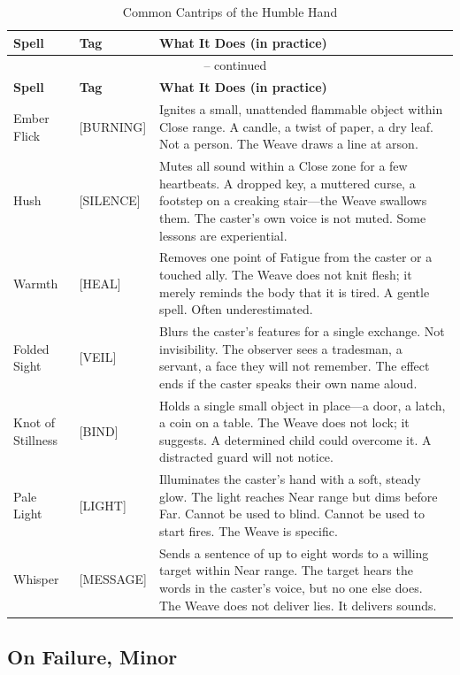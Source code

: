 \medskip
\noindent
\begin{longtable}{p{} p{} p{}}
\caption{Common Cantrips of the Humble Hand}\\
\midrule
\textbf{Spell} & \textbf{Tag} & \textbf{What It Does (in practice)}\\
\midrule
\endfirsthead
\multicolumn{3}{c}{\tablename\ \thetable{} -- continued}\\
\midrule
\textbf{Spell} & \textbf{Tag} & \textbf{What It Does (in practice)}\\
\midrule
\endhead
Ember Flick & [BURNING] & Ignites a small, unattended flammable object within Close range. A candle, a twist of paper, a dry leaf. Not a person. The Weave draws a line at arson. \\
Hush & [SILENCE] & Mutes all sound within a Close zone for a few heartbeats. A dropped key, a muttered curse, a footstep on a creaking stair---the Weave swallows them. The caster's own voice is not muted. Some lessons are experiential. \\
Warmth & [HEAL] & Removes one point of Fatigue from the caster or a touched ally. The Weave does not knit flesh; it merely reminds the body that it is tired. A gentle spell. Often underestimated. \\
Folded Sight & [VEIL] & Blurs the caster's features for a single exchange. Not invisibility. The observer sees a tradesman, a servant, a face they will not remember. The effect ends if the caster speaks their own name aloud. \\
Knot of Stillness & [BIND] & Holds a single small object in place---a door, a latch, a coin on a table. The Weave does not lock; it suggests. A determined child could overcome it. A distracted guard will not notice. \\
Pale Light & [LIGHT] & Illuminates the caster's hand with a soft, steady glow. The light reaches Near range but dims before Far. Cannot be used to blind. Cannot be used to start fires. The Weave is specific. \\
Whisper & [MESSAGE] & Sends a sentence of up to eight words to a willing target within Near range. The target hears the words in the caster's voice, but no one else does. The Weave does not deliver lies. It delivers sounds. \\
\hline
\end{longtable}

\subsection{On Failure, Minor}

